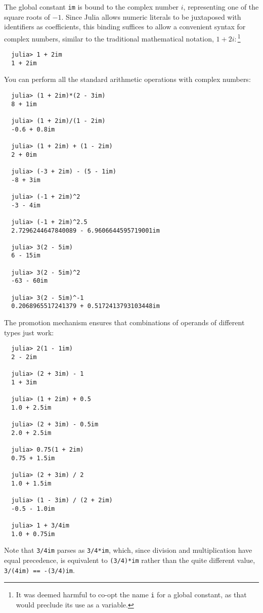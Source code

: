 \documentclass{article}
\begin{document}
The global constant \verb|im| is bound to the complex number $i$, representing one of the square roots of $-1$.
Since Julia allows numeric literals to be juxtaposed with identifiers as coefficients, this binding suffices to allow a convenient syntax for complex numbers, similar to the traditional mathematical notation, $1 + 2i$:\,\footnote{It was deemed harmful to co-opt the name \texttt{i} for a global constant, as that would preclude its use as a variable.}
\begin{verbatim}
  julia> 1 + 2im
  1 + 2im
\end{verbatim}
You can perform all the standard arithmetic operations with complex numbers:
\begin{verbatim}
  julia> (1 + 2im)*(2 - 3im)
  8 + 1im

  julia> (1 + 2im)/(1 - 2im)
  -0.6 + 0.8im

  julia> (1 + 2im) + (1 - 2im)
  2 + 0im

  julia> (-3 + 2im) - (5 - 1im)
  -8 + 3im

  julia> (-1 + 2im)^2
  -3 - 4im

  julia> (-1 + 2im)^2.5
  2.7296244647840089 - 6.9606644595719001im

  julia> 3(2 - 5im)
  6 - 15im

  julia> 3(2 - 5im)^2
  -63 - 60im

  julia> 3(2 - 5im)^-1
  0.2068965517241379 + 0.5172413793103448im
\end{verbatim}
The promotion mechanism ensures that combinations of operands of different types just work:
\begin{verbatim}
  julia> 2(1 - 1im)
  2 - 2im

  julia> (2 + 3im) - 1
  1 + 3im

  julia> (1 + 2im) + 0.5
  1.0 + 2.5im

  julia> (2 + 3im) - 0.5im
  2.0 + 2.5im

  julia> 0.75(1 + 2im)
  0.75 + 1.5im

  julia> (2 + 3im) / 2
  1.0 + 1.5im

  julia> (1 - 3im) / (2 + 2im)
  -0.5 - 1.0im

  julia> 1 + 3/4im
  1.0 + 0.75im
\end{verbatim}
Note that \verb|3/4im| parses as \verb|3/4*im|, which, since division and multiplication have equal precedence, is equivalent to \verb|(3/4)*im| rather than the quite different value, \verb|3/(4im) == -(3/4)im|.
\end{document}
